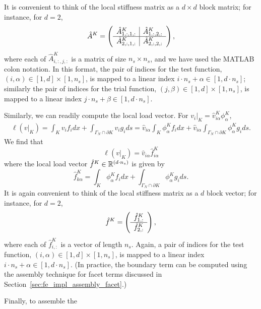 It is convenient to think of the local stiffness matrix as a $d \times d$ block matrix; for instance, for $d = 2$,
\begin{equation*}
  \hat A^K = \bmat{c|c}
  \hat A^{K}_{1,:,1,:} &  \hat A^{K}_{1,:,2,:} \\
  \hline
  \hat A^{K}_{2,:,1,:} &  \hat A^{K}_{2,:,2,:}
  \emat,
\end{equation*}
where each of $\hat A^K_{i,:,j,:}$ is a matrix of size $n_s \times n_s$, and we have used the MATLAB colon notation. In this format, the pair of indices for the test function, $(i, \alpha)\in [1,d] \times [1,n_s]$, is mapped to a linear index $i \cdot n_s + \alpha \in [1,d\cdot n_s]$; similarly the pair of indices for the trial function, $(j,\beta)\in [1,d] \times [1,n_s]$, is mapped to a linear index $j \cdot n_s + \beta \in [1,d\cdot n_s]$.

Similarly, we can readily compute the local load vector. For $v_i|_K = \hat v^K_{i\alpha} \phi^K_\alpha$, 
\begin{align*}
  \ell(v|_K) = \int_K v_i f_i dx + \int_{\Gamma_N \cap \partial K} v_i g_i ds 
  =  \hat v_{i\alpha} \int_K \phi^K_\alpha f_{i} dx + \hat v_{i\alpha} \int_{\Gamma_N \cap \partial K} \phi^K_\alpha g_i ds.
\end{align*}
We find that
\begin{equation*}
  \ell(v|_K) = \hat v_{i\alpha} \hat f^K_{i\alpha}
\end{equation*}
where the local load vector $\hat f^K \in \RR^{(d\cdot n_s)}$ is given by
\begin{equation*}
  \hat f^K_{k\alpha} =  \int_K \phi^K_\alpha f_{i} dx + \int_{\Gamma_N \cap \partial K} \phi^K_\alpha g_i ds.
\end{equation*}
It is again convenient to think of the local stiffness matrix as a $d$ block vector; for instance, for $d = 2$,
\begin{equation*}
  \hat f^K = \bmat{c} \hat f^K_{1,:} \\ \hline \hat f^K_{2,:} \emat,
\end{equation*}
where each of $\hat f^K_{i,:}$ is a vector of length $n_s$. Again, a pair of indices for the test function, $(i,\alpha) \in [1,d] \times [1,n_s]$, is mapped to a linear index $i \cdot n_s + \alpha \in [1,d\cdot n_s]$. (In practice, the boundary term can be computed using the assembly technique for facet terms discussed in Section~\ref{sec:fe_impl_assembly_facet}.)

Finally, to assemble the 

